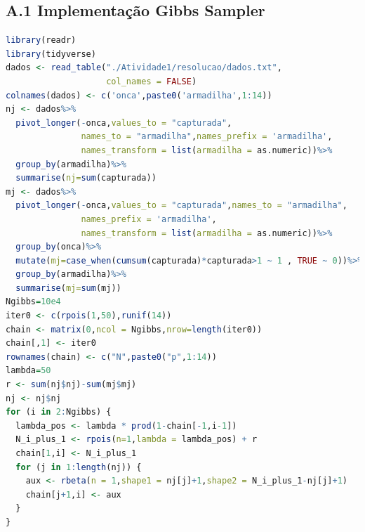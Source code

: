 \documentclass[a4paper,12pt,twoside]{article}
\begin{document}
\subsection*{A.1 Implementação Gibbs Sampler}
\begin{lstlisting}[language=R]
library(readr)
library(tidyverse)
dados <- read_table("./Atividade1/resolucao/dados.txt", 
                    col_names = FALSE)
colnames(dados) <- c('onca',paste0('armadilha',1:14))
nj <- dados%>%
  pivot_longer(-onca,values_to = "capturada",
               names_to = "armadilha",names_prefix = 'armadilha',
               names_transform = list(armadilha = as.numeric))%>%
  group_by(armadilha)%>%
  summarise(nj=sum(capturada))
mj <- dados%>%
  pivot_longer(-onca,values_to = "capturada",names_to = "armadilha",
               names_prefix = 'armadilha',
               names_transform = list(armadilha = as.numeric))%>%
  group_by(onca)%>%
  mutate(mj=case_when(cumsum(capturada)*capturada>1 ~ 1 , TRUE ~ 0))%>%
  group_by(armadilha)%>%
  summarise(mj=sum(mj))
Ngibbs=10e4
iter0 <- c(rpois(1,50),runif(14))
chain <- matrix(0,ncol = Ngibbs,nrow=length(iter0))
chain[,1] <- iter0
rownames(chain) <- c("N",paste0("p",1:14))
lambda=50
r <- sum(nj$nj)-sum(mj$mj)
nj <- nj$nj 
for (i in 2:Ngibbs) {
  lambda_pos <- lambda * prod(1-chain[-1,i-1])
  N_i_plus_1 <- rpois(n=1,lambda = lambda_pos) + r
  chain[1,i] <- N_i_plus_1 
  for (j in 1:length(nj)) {
    aux <- rbeta(n = 1,shape1 = nj[j]+1,shape2 = N_i_plus_1-nj[j]+1)
    chain[j+1,i] <- aux
  }
}
\end{lstlisting}

\end{document}

